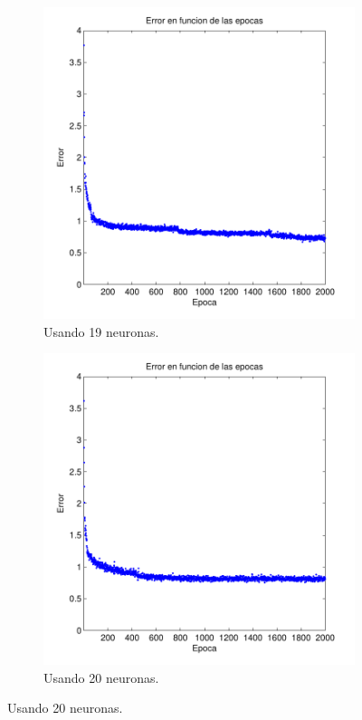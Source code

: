 \documentclass[informe.tex]{subfiles}
\begin{document}
\begin{figure}[H]
        \begin{subfigure}[b]{0.32\textwidth}
                \includegraphics[width=\textwidth]{graficos/error_fold2_19_binary-regresion_2000_01.pdf}
                \caption{Usando 19 neuronas.}
                \label{fig:d2-f2-2k-01-n19}
        \end{subfigure}
        \begin{subfigure}[b]{0.32\textwidth}
                \includegraphics[width=\textwidth]{graficos/error_fold2_20_binary-regresion_2000_01.pdf}
                \caption{Usando 20 neuronas.}
                \label{fig:d2-f2-2k-01-n20}
        \end{subfigure}
        

\end{figure}
\end{document}
